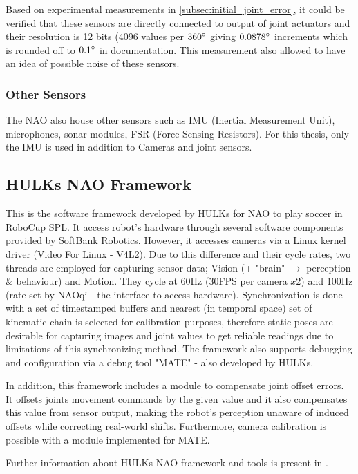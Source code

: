 \documentclass[english, printversion, nomenclature, notitle]{tuvisionthesis} %
\begin{document}
Based on experimental measurements in \cref{subsec:initial_joint_error}, it could be verified that these sensors are directly connected to output of joint actuators and their resolution is 12 bits (4096 values per $360\degree$ giving $0.0878\degree$ increments which is rounded off to $0.1\degree$ in documentation. This measurement also allowed to have an idea of possible noise of these sensors.

\subsubsection{Other Sensors}
The NAO also house other sensors such as IMU (Inertial Measurement Unit), microphones, sonar modules, FSR (Force Sensing Resistors). For this thesis, only the IMU is used in addition to Cameras and joint sensors.

\subsection{HULKs NAO Framework}
This is the software framework developed by HULKs for NAO to play soccer in RoboCup SPL. It access robot's hardware through several software components provided by SoftBank Robotics. However, it accesses cameras via a Linux kernel driver (Video For Linux - V4L2). Due to this difference and their cycle rates, two threads are employed for capturing sensor data; Vision (+ "brain" $\rightarrow$ perception \& behaviour) and Motion. They cycle at 60Hz (30FPS per camera $x 2$) and 100Hz (rate set by NAOqi - the interface to access hardware). Synchronization is done with a set of timestamped buffers and nearest (in temporal space) set of kinematic chain is selected for calibration purposes, therefore static poses are desirable for capturing images and joint values to get reliable readings due to limitations of this synchronizing method. The framework also supports debugging and configuration via a debug tool "MATE" - also developed by HULKs. 

In addition, this framework includes a module to compensate joint offset errors. It offsets joints movement commands by the given value and it also compensates this value from sensor output, making the robot's perception unaware of induced offsets while correcting real-world shifts. Furthermore, camera calibration is possible with a module implemented for MATE.

Further information about HULKs NAO framework and tools is present in \cite{darshana_adikari_team_2017}.
\end{document}
